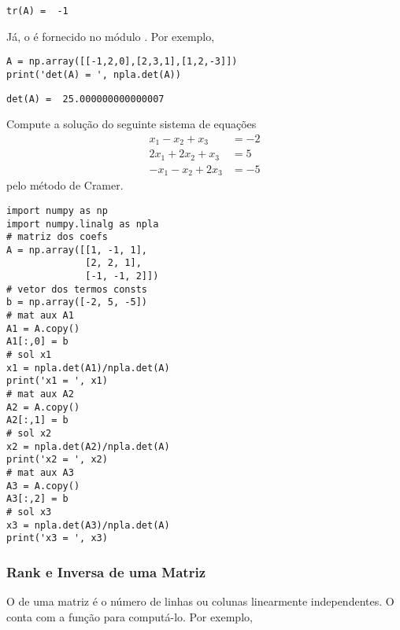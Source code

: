 \begin{verbatim}
tr(A) =  -1
\end{verbatim}

Já, o  é fornecido no módulo {\PYTHONnumpyDOTlinalg}. Por exemplo,

\begin{lstlisting}
A = np.array([[-1,2,0],[2,3,1],[1,2,-3]])
print('det(A) = ', npla.det(A))
\end{lstlisting}

\begin{verbatim}
det(A) =  25.000000000000007
\end{verbatim}

\begin{exer}
  Compute a solução do seguinte sistema de equações
  \begin{equation}
    \begin{aligned}
      x_1 - x_2 + x_3 &= -2 \\
      2x_1 + 2x_2 + x_3 &= 5 \\
      -x_1 - x_2 + 2x_3 &= -5
    \end{aligned}
  \end{equation}
  pelo método de Cramer{\cramer}.
\end{exer}
\begin{resp}
  
\begin{lstlisting}
import numpy as np
import numpy.linalg as npla
# matriz dos coefs
A = np.array([[1, -1, 1],
              [2, 2, 1],
              [-1, -1, 2]])
# vetor dos termos consts
b = np.array([-2, 5, -5])
# mat aux A1
A1 = A.copy()
A1[:,0] = b
# sol x1
x1 = npla.det(A1)/npla.det(A)
print('x1 = ', x1)
# mat aux A2
A2 = A.copy()
A2[:,1] = b
# sol x2
x2 = npla.det(A2)/npla.det(A)
print('x2 = ', x2)
# mat aux A3
A3 = A.copy()
A3[:,2] = b
# sol x3
x3 = npla.det(A3)/npla.det(A)
print('x3 = ', x3)
\end{lstlisting}

\end{resp}


\subsubsection{Rank e Inversa de uma Matriz}

O  de uma matriz é o número de linhas ou colunas linearmente independentes. O {\PYTHONnumpy} conta com a função \hl{\PYTHONnumpyDOTlinalgDOTmatrixrank} para computá-lo. Por exemplo,

